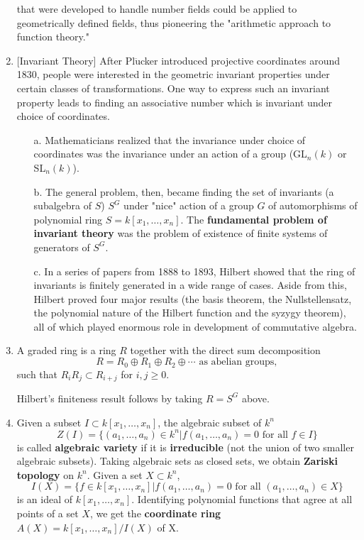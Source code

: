 \begin{enumerate}
            that were developed to handle number fields could be applied to geometrically defined fields, thus
            pioneering the "arithmetic approach to function theory."
      \item
            $[$Invariant Theory]
                  After Pl$\ddot{\text{u}}$cker introduced projective coordinates around 1830, people were
            interested in the geometric invariant properties under certain classes of transformations. One way to
            express such an invariant property leads to finding an associative number which is invariant under
            choice of coordinates.
            \begin{enumerate}
                  \item[a.]
                        Mathematicians realized that the invariance under choice of coordinates was the invariance
                        under an action of a group (GL$_n(k)$ or SL$_n(k)$).
                  \item[b.]
                        The general problem, then, became finding the set of invariants (a subalgebra of $S$) $S^G$ under
                        "nice" action of a group $G$ of automorphisms of polynomial ring $S=k[x_1,\ldots,x_n]$.
                        The \textbf{fundamental problem of invariant theory} was the problem of existence of
                        finite systems of generators of $S^G$.
                  \item[c.]
                        In a series of papers from 1888 to 1893, Hilbert showed that the ring of invariants is finitely
                        generated in a wide range of cases. Aside from this, Hilbert proved four major results (the basis
                        theorem, the Nullstellensatz, the polynomial nature of the Hilbert function and the syzygy theorem),
                        all of which played enormous role in development of commutative algebra.
            \end{enumerate}
            
      \item
            A graded ring is a ring $R$ together with the direct sum decomposition
            $$R=R_0\oplus R_1 \oplus R_2\oplus\cdots \text{ as abelian groups},$$
            such that $R_iR_j \subset R_{i+j}$ for $i,j\geq 0$.
            
            Hilbert's finiteness result follows by taking $R=S^G$ above.
      \item
            Given a subset $I\subset k[x_1,\ldots,x_n]$, the algebraic subset of $k^n$
            $$Z(I)=\{(a_1,\ldots,a_n)\in k^n | f(a_1,\ldots,a_n)=0\text{ for all }f\in I\}$$
            is called \textbf{algebraic variety} if it is \textbf{irreducible} (not the union of two smaller
            algebraic subsets). Taking algebraic sets as closed sets, we obtain \textbf{Zariski topology} on $k^n$.
            Given a set $X\subset k^n$, $$I(X) =\{f\in k[x_1,\ldots,x_n]|f(a_1,\ldots,a_n)=0\text{ for all }
                  (a_1,\ldots,a_n)\in X\}$$ is an ideal of $k[x_1,\ldots,x_n]$. Identifying polynomial functions that
            agree at all points of a set $X$, we get the \textbf{coordinate ring} $A(X)=k[x_1,\ldots,x_n]/I(X)$ of X.
\end{enumerate}